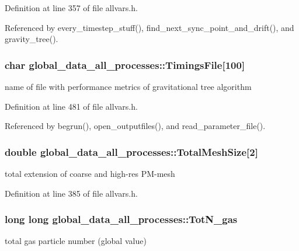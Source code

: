 Definition at line 357 of file allvars.h.



Referenced by every\_\-timestep\_\-stuff(), find\_\-next\_\-sync\_\-point\_\-and\_\-drift(), and gravity\_\-tree().

\hypertarget{structglobal__data__all__processes_ae0f7c691d211f8076374cc55271022e8}{
\subsubsection[{TimingsFile}]{\setlength{\rightskip}{0pt plus 5cm}char {\bf global\_\-data\_\-all\_\-processes::TimingsFile}\mbox{[}100\mbox{]}}}
\label{structglobal__data__all__processes_ae0f7c691d211f8076374cc55271022e8}
name of file with performance metrics of gravitational tree algorithm 

Definition at line 481 of file allvars.h.



Referenced by begrun(), open\_\-outputfiles(), and read\_\-parameter\_\-file().

\hypertarget{structglobal__data__all__processes_a1d2411089720f3ad0b8a294f5a693475}{
\subsubsection[{TotalMeshSize}]{\setlength{\rightskip}{0pt plus 5cm}double {\bf global\_\-data\_\-all\_\-processes::TotalMeshSize}\mbox{[}2\mbox{]}}}
\label{structglobal__data__all__processes_a1d2411089720f3ad0b8a294f5a693475}
total extension of coarse and high-\/res PM-\/mesh 

Definition at line 385 of file allvars.h.

\hypertarget{structglobal__data__all__processes_a2bb70816a4d5f56e0df2d9b8d706cef2}{
\subsubsection[{TotN\_\-gas}]{\setlength{\rightskip}{0pt plus 5cm}long long {\bf global\_\-data\_\-all\_\-processes::TotN\_\-gas}}}
\label{structglobal__data__all__processes_a2bb70816a4d5f56e0df2d9b8d706cef2}
total gas particle number (global value) 


